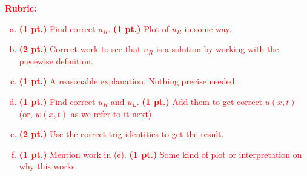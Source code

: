 \documentclass[12pt]{article} %
\begin{document}
\textcolor{red}{
\noindent \textbf{Rubric:}
\begin{enumerate}[(a)]
    \item \textbf{(1 pt.)} Find correct $u_R$. \textbf{(1 pt.)} Plot of $u_R$ in some way.
	\item \textbf{(2 pt.)} Correct work to see that $u_R$ is a solution by working with the piecewise definition.
	\item \textbf{(1 pt.)} A reasonable explanation. Nothing precise needed.
	\item \textbf{(1 pt.)} Find correct $u_R$ and $u_L$. \textbf{(1 pt.)} Add them to get correct $u(x,t)$ (or, $w(x,t)$ as we refer to it next).
	\item \textbf{(2 pt.)} Use the correct trig identities to get the result.
	\item \textbf{(1 pt.)} Mention work in (e). \textbf{(1 pt.)} Some kind of plot or interpretation on why this works.
\end{enumerate}
}
\end{document}
